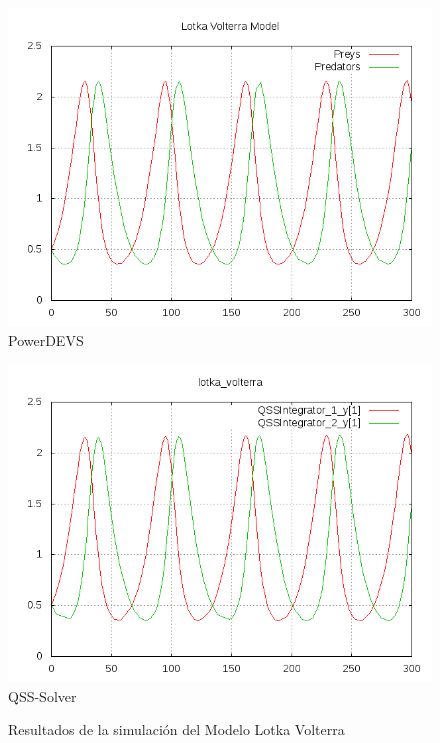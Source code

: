 \begin{figure}[H]
\centering
\begin{minipage}{0.5\textwidth}
\centering
 \includegraphics[width=\linewidth]{output/powerdevs/lotka_volterra/lotka_volterra-pd.png}
PowerDEVS \\
\end{minipage}\hfill
\begin{minipage}{0.5\textwidth}
\centering
 \includegraphics[width=\linewidth]{output/qss-solver/lotka_volterra/lotka_volterra-qss.png}
QSS-Solver \\
\end{minipage}
\label{graph:lotka_voltera}
\caption{Resultados de la simulación del Modelo Lotka Volterra}
\end{figure}

